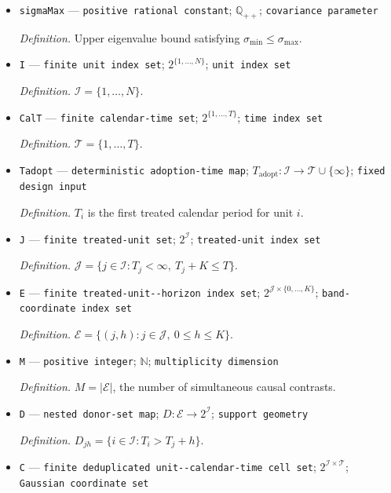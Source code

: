\documentclass{article}
\begin{document}
\begin{itemize}
  \item \texttt{sigmaMax} --- \texttt{positive rational constant}; \(\mathbb Q_{++}\); \texttt{covariance parameter}
  \par\smallskip\noindent\emph{Definition.} Upper eigenvalue bound satisfying \(\sigma_{\min}\le\sigma_{\max}\).
  \item \texttt{I} --- \texttt{finite unit index set}; \(2^{\{1,\ldots,N\}}\); \texttt{unit index set}
  \par\smallskip\noindent\emph{Definition.} \(\mathcal I=\{1,\ldots,N\}\).
  \item \texttt{CalT} --- \texttt{finite calendar-\allowbreak{}time set}; \(2^{\{1,\ldots,T\}}\); \texttt{time index set}
  \par\smallskip\noindent\emph{Definition.} \(\mathcal T=\{1,\ldots,T\}\).
  \item \texttt{Tadopt} --- \texttt{deterministic adoption-\allowbreak{}time map}; \(T_{\mathrm{adopt}}:\mathcal I\to\mathcal T\cup\{\infty\}\); \texttt{fixed design input}
  \par\smallskip\noindent\emph{Definition.} \(T_i\) is the first treated calendar period for unit \(i\).
  \item \texttt{J} --- \texttt{finite treated-\allowbreak{}unit set}; \(2^{\mathcal I}\); \texttt{treated-\allowbreak{}unit index set}
  \par\smallskip\noindent\emph{Definition.} \(\mathcal J=\{j\in\mathcal I:T_j<\infty,\ T_j+K\le T\}\).
  \item \texttt{E} --- \texttt{finite treated-\allowbreak{}unit-\allowbreak{}-\allowbreak{}horizon index set}; \(2^{\mathcal J\times\{0,\ldots,K\}}\); \texttt{band-\allowbreak{}coordinate index set}
  \par\smallskip\noindent\emph{Definition.} \(\mathcal E=\{(j,h):j\in\mathcal J,\ 0\le h\le K\}\).
  \item \texttt{M} --- \texttt{positive integer}; \(\mathbb N\); \texttt{multiplicity dimension}
  \par\smallskip\noindent\emph{Definition.} \(M=|\mathcal E|\), the number of simultaneous causal contrasts.
  \item \texttt{D} --- \texttt{nested donor-\allowbreak{}set map}; \(D:\mathcal E\to2^{\mathcal I}\); \texttt{support geometry}
  \par\smallskip\noindent\emph{Definition.} \(D_{jh}=\{i\in\mathcal I:T_i>T_j+h\}\).
  \item \texttt{C} --- \texttt{finite deduplicated unit-\allowbreak{}-\allowbreak{}calendar-\allowbreak{}time cell set}; \(2^{\mathcal I\times\mathcal T}\); \texttt{Gaussian coordinate set}

\end{itemize}
\end{document}
